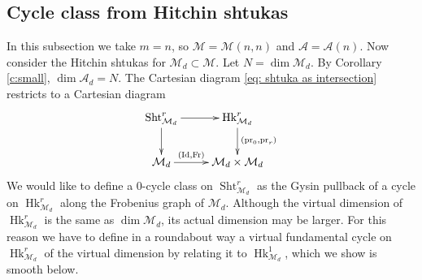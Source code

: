 \documentclass[reqno]{amsart}
\numberwithin{equation}{section}
\DeclareMathOperator{\GL}{GL}
\DeclareMathOperator{\Frob}{Fr}
\DeclareMathOperator{\coker}{coker}
\DeclareMathOperator{\Hom}{Hom}
\DeclareMathOperator{\End}{End}
\DeclareMathOperator{\Id}{Id}
\DeclareMathOperator{\Sht}{Sht}
\DeclareMathOperator{\pr}{pr}
\DeclareMathOperator{\Hk}{Hk}
\newcommand\un{\underline}
\newcommand{\bu}{\bullet}
\newcommand\xr{\xrightarrow}
\renewcommand\c{\circ}
\newcommand\upH{\textup{H}}
\renewcommand\a\alpha
\renewcommand\d\delta
\renewcommand{\th}{\theta}
\newcommand{\ph}{\varphi}
\newcommand{\y}{\eta}
\newcommand\sh{\sharp}
\newcommand\cA{\mathcal{A}}
\newcommand\cE{\mathcal{E}}
\newcommand\cF{\mathcal{F}}
\newcommand\cK{\mathcal{K}}
\newcommand\cM{\mathcal{M}}
\newtheorem{prop}[thm]{Proposition}
\theoremstyle{remark}
\numberwithin{equation}{section}
\begin{document}




\subsection{Cycle class from Hitchin shtukas}\label{ss:ShtM cycle}

In this subsection we take $m=n$, so $\cM = \cM(n,n)$ and $\cA = \cA(n)$. Now consider the Hitchin shtukas for $\cM_{d}\subset \cM$. Let $N=\dim \cM_{d}$. By Corollary \ref{c:small}, $\dim \cA_{d}=N$. The Cartesian diagram \eqref{eq: shtuka as intersection} restricts to a Cartesian diagram
\begin{equation}\label{def ShtMd}
\xymatrix{\Sht_{\cM_{d}}^{r}\ar[d] \ar[r] & \Hk^{r}_{\cM_{d}}\ar[d]^{(\pr_{0},\pr_{r})}\\
\cM_{d}\ar[r]^-{(\Id, \Frob)} & \cM_{d}\times\cM_{d}}
\end{equation}
We would like to define a $0$-cycle class on $\Sht_{\cM_{d}}^{r}$ as the Gysin pullback of a cycle on $\Hk^{r}_{\cM_{d}}$ along the Frobenius graph of $\cM_{d}$. Although the virtual dimension of $\Hk^{r}_{\cM_{d}}$ is the same as $\dim\cM_{d}$, its actual dimension may be larger. For this reason we have to define in a roundabout way a virtual fundamental cycle on $\Hk^{r}_{\cM_{d}}$ of the virtual dimension by relating it to $\Hk^{1}_{\cM_{d}}$, which we show is smooth below. 
\end{document}
